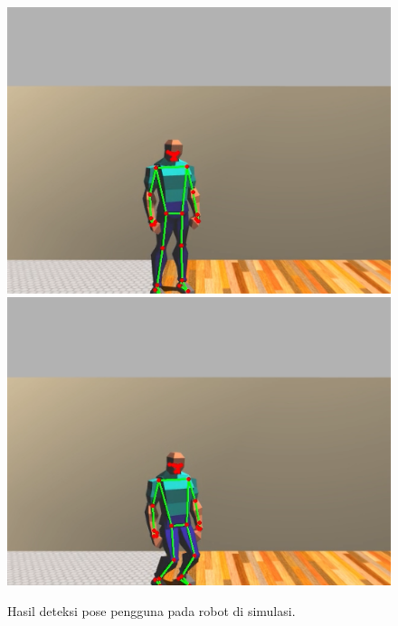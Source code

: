 \begin{figure}[ht]
  \centering
  \includegraphics[height=0.35\textwidth,keepaspectratio]{gambar/hasil-deteksi-pose-berdiri.png}
  \includegraphics[height=0.35\textwidth,keepaspectratio]{gambar/hasil-deteksi-pose-duduk.png}
  \caption{Hasil deteksi pose pengguna pada robot di simulasi.}
  \label{fig:hasildeteksipose}
\end{figure}
